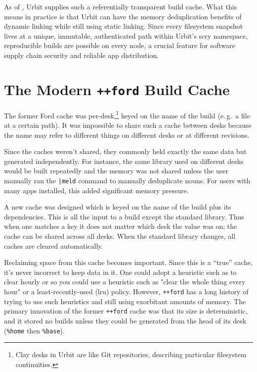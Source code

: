 \documentclass[twoside]{article}
\begin{document}
As of , Urbit supplies such a referentially transparent build cache.  What this means in practice is that Urbit can have the memory deduplication benefits of dynamic linking while still using static linking.  Since every filesystem snapshot lives at a unique, immutable, authenticated path within Urbit's scry namespace, reproducible builds are possible on every node, a crucial feature for software supply chain security and reliable app distribution.

\section[The Modern \texttt{++ford} Build Cache]{The Modern \texttt{++ford} Build Cache}

\sloppy
The former Ford cache was per-desk,\footnote{Clay desks in Urbit are like Git repositories, describing particular filesystem continuities.} keyed on the name of the build (e.\,g.\ a file at a certain path).  It was impossible to share such a cache between desks because the name may refer to different things on different desks or at different revisions.

Since the caches weren't shared, they commonly held exactly the same data but generated independently.  For instance, the same library used on different desks would be built repeatedly and the memory was not shared unless the user manually ran the \lstinline[style=inlinecode]{|meld} command to manually deduplicate nouns.  For users with many apps installed, this added significant memory pressure.

A new cache was designed which is keyed on the name of the build plus its dependencies. This is all the input to a build except the standard library.  Thus when one matches a key it does not matter which desk the value was on; the cache can be shared across all desks.  When the standard library changes, all caches are cleared automatically.

Reclaiming space from this cache becomes important.  Since this is a “true” cache, it's never incorrect to keep data in it.  One could adopt a heuristic such as to clear hourly or so you could use a heuristic such as "clear the whole thing every hour" or a least-recently-used ({\sc lru}) policy.  However, \lstinline[style=inlinecode]{++ford} has a long history of trying to use such heuristics and still using exorbitant amounts of memory.  The primary innovation of the former \lstinline[style=inlinecode]{++ford} cache was that its size is deterministic, and it stored no builds unless they could be generated from the head of its desk (\lstinline[style=inlinecode]{%home} then \lstinline[style=inlinecode]{%base}).
\end{document}
